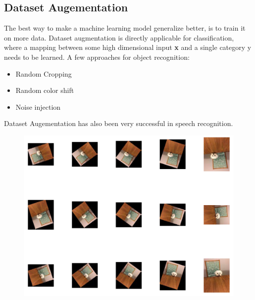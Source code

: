 \begin{multicols}{2}
		\subsection{Dataset Augementation}
	The best way to make a machine learning model generalize better, is to train it on more data. Dataset augmentation is directly applicable for classification, where a mapping between some high dimensional input \textbf{x} and a single category y needs to be learned.
	A few approaches for object recognition:
	\begin{itemize}
		\item Random Cropping
		\item Random color shift
		\item Noise injection
	\end{itemize}
	Dataset Augementation has also been very successful in speech recognition.
	\begin{figure}[H]
		\centering
		\includegraphics[width=1\linewidth]{images/datasetAugementation.PNG}
	\end{figure}
	

\end{multicols}
